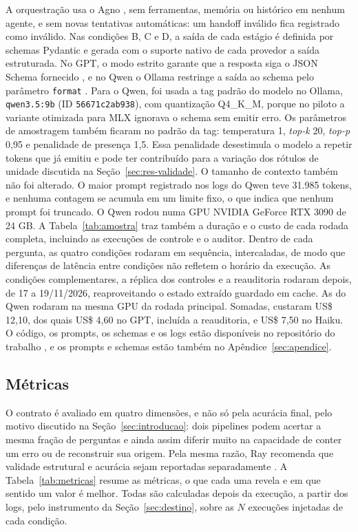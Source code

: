 A orquestração usa o Agno \cite{agno}, sem ferramentas, memória ou histórico em nenhum agente, e sem novas tentativas automáticas: um handoff inválido fica registrado como inválido.
Nas condições B, C e D, a saída de cada estágio é definida por schemas Pydantic \cite{pydantic} e gerada com o suporte nativo de cada provedor a saída estruturada.
No GPT, o modo estrito garante que a resposta siga o JSON Schema fornecido \cite{openai2026structured}, e no Qwen o Ollama restringe a saída ao schema pelo parâmetro \texttt{format} \cite{ollama2024structured}.
Para o Qwen, foi usada a tag padrão do modelo no Ollama, \texttt{qwen3.5:9b} (ID \texttt{56671c2ab938}), com quantização Q4\_K\_M, porque no piloto a variante otimizada para MLX ignorava o schema sem emitir erro.
Os parâmetros de amostragem também ficaram no padrão da tag: temperatura 1, \emph{top-k} 20, \emph{top-p} 0,95 e penalidade de presença 1,5.
Essa penalidade desestimula o modelo a repetir tokens que já emitiu e pode ter contribuído para a variação dos rótulos de unidade discutida na Seção~\ref{sec:res-validade}.
O tamanho de contexto também não foi alterado. O maior prompt registrado nos logs do Qwen teve 31.985 tokens, e nenhuma contagem se acumula em um limite fixo, o que indica que nenhum prompt foi truncado.
O Qwen rodou numa GPU NVIDIA GeForce RTX 3090 de 24 GB.
A Tabela~\ref{tab:amostra} traz também a duração e o custo de cada rodada completa, incluindo as execuções de controle e o auditor.
Dentro de cada pergunta, as quatro condições rodaram em sequência, intercaladas, de modo que diferenças de latência entre condições não refletem o horário da execução.
As condições complementares, a réplica dos controles e a reauditoria rodaram depois, de 17 a 19/11/2026, reaproveitando o estado extraído guardado em cache. As do Qwen rodaram na mesma GPU da rodada principal. Somadas, custaram US\$ 12,10, dos quais US\$ 4,60 no GPT, incluída a reauditoria, e US\$ 7,50 no Haiku.
O código, os prompts, os schemas e os logs estão disponíveis no repositório do trabalho \cite{repositorio}, e os prompts e schemas estão também no Apêndice~\ref{sec:apendice}.

\subsection{Métricas}\label{sec:metricas}

O contrato é avaliado em quatro dimensões, e não só pela acurácia final, pelo motivo discutido na Seção~\ref{sec:introducao}: dois pipelines podem acertar a mesma fração de perguntas e ainda assim diferir muito na capacidade de conter um erro ou de reconstruir sua origem.
Pela mesma razão, Ray recomenda que validade estrutural e acurácia sejam reportadas separadamente \cite{ray2026constraint}.
A Tabela~\ref{tab:metricas} resume as métricas, o que cada uma revela e em que sentido um valor é melhor.
Todas são calculadas depois da execução, a partir dos logs, pelo instrumento da Seção~\ref{sec:destino}, sobre as $N$ execuções injetadas de cada condição.

